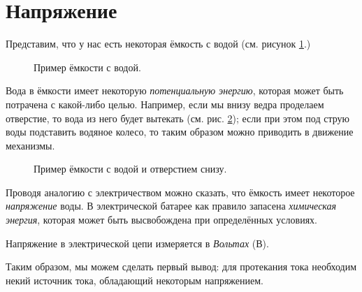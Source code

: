 \documentclass[../sparc.tex]{subfiles}
\begin{document}
\section{Напряжение}

Представим, что у нас есть некоторая ёмкость с водой (см. рисунок
\ref{fig:electronics-current-0}.)

\begin{figure}[ht]
  \centering
  \caption{Пример ёмкости с водой.}
  \label{fig:electronics-current-0}
\end{figure}

Вода в ёмкости имеет некоторую \emph{потенциальную энергию}, которая может быть
потрачена с какой-либо целью.  Например, если мы внизу ведра проделаем
отверстие, то вода из него будет вытекать
(см. рис. \ref{fig:electronics-current-1}); если при этом под струю воды
подставить водяное колесо, то таким образом можно приводить в движение
механизмы.

\begin{figure}[ht]
  \centering
  \caption{Пример ёмкости с водой и отверстием снизу.}
  \label{fig:electronics-current-1}
\end{figure}

Проводя аналогию с электричеством можно сказать, что ёмкость имеет некоторое
\emph{напряжение} воды.  В электрической батарее как правило запасена
\emph{химическая энергия}, которая может быть высвобождена при определённых
условиях.

Напряжение в электрической цепи измеряется в \emph{Вольтах} (В).

Таким образом, мы можем сделать первый вывод: для протекания тока необходим
некий источник тока, обладающий некоторым напряжением.
\end{document}
